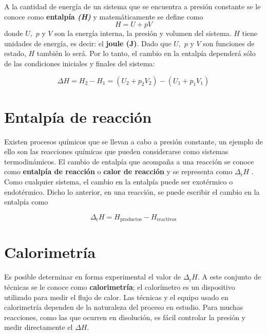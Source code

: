 A la cantidad de energía de un sistema que se encuentra a presión constante se le conoce como \textbf{entalpía \textit{(H)}} y matemáticamente se define como 
\begin{equation}
 H = U + pV
 \label{eq:3.2}
\end{equation}
donde $U,$ $p$ y $V$ son  la energía interna, la presión y volumen del sistema. $H$ tiene unidades de energía, es decir: el \textbf{joule (J)}. Dado que $U,$ $p$ y $V$ son funciones de estado,  $H$ también lo será. Por lo tanto, el cambio en la entalpía dependerá sólo de las condiciones iniciales y finales del sistema:

\begin{equation}
\Delta H = H_{2} - H_{1} = (U_{2} + p_{2}V_{2})-(U_{1} + p_{1}V_{1})
\label{eq:3.3}
\end{equation}

\newpage
\section{Entalpía de reacción}

Existen procesos químicos que se llevan a cabo a presión constante, un ejemplo de ello son las reacciones químicas que pueden considerarse como sistemas termodinámicos. El cambio de entalpía que acompaña a una reacción se conoce como \textbf{entalpía de reacción} o \textbf{calor de reacción} y se representa como $\Delta_{\mathrm{r}}H$ \cite{Atkins2014}. Como cualquier sistema, el cambio en la entalpía puede ser exotérmico o endotérmico. Dicho lo anterior, en una reacción, se puede escribir el cambio en la entalpía como

\begin{equation}
	\Delta _\mathrm{r}H = H_{\mathrm{productos}} - H_{\mathrm{reactivos}}
\label{eq:3.4}
\end{equation}

\section{Calorimetría}

Es posible determinar en forma experimental el valor de $\Delta _\mathrm{r}H$. A este conjunto de técnicas se le conoce como \textbf{calorimetría}; el calorímetro es un dispositivo utilizado para medir el flujo de calor. Las técnicas y el equipo usado en calorimetría dependen de la naturaleza del proceso en estudio. Para muchas reacciones, como las que ocurren en disolución, es fácil controlar la presión y medir directamente el $\Delta H$.


